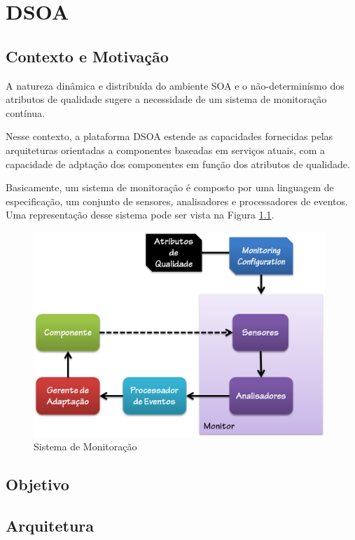 \chapter{DSOA}
\label{ch:3}

\section{Contexto e Motivação}


A natureza dinâmica e distribuída do ambiente SOA e o não-determinísmo dos atributos de qualidade sugere a necessidade de um sistema de monitoração contínua.

Nesse contexto, a plataforma DSOA estende as capacidades fornecidas pelas arquiteturas orientadas a componentes baseadas em serviços atuais, com a capacidade de adptação dos componentes em função dos atributos de qualidade.

Basicamente, um sistema de monitoração é composto por uma linguagem de especificação, um conjunto de sensores, analisadores e processadores de eventos. Uma representação desse sistema pode ser vista na Figura \ref{fig:monitor}.

\begin{figure}[htp]
\centering
\includegraphics[width=11cm]{chapters/chapter3/monitor.png}
\caption{Sistema de Monitoração}
\label{fig:monitor}
\end{figure}


\section{Objetivo}

\section{Arquitetura}
\label{sec:dsoa_arch}

